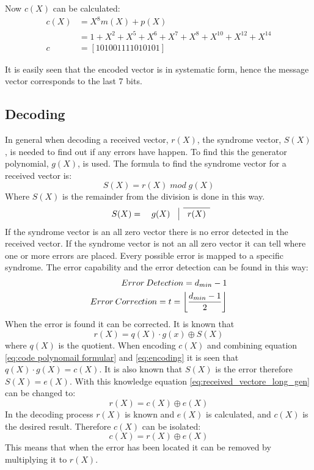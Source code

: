 \documentclass[Main]{subfiles}
\begin{document}
\noindent Now $c(X)$ can be calculated:
\begin{align}
c(X) &= X^8m(X)+p(X)\\ 
	&= 1 + X^2 + X^5 + X^6 + X^7 + X^8 + X^{10}+ X^{12} + X^{14} \\
c &= [1 0 1 0 0 1 1 1 1 0 1 0 1 0 1]
\end{align}

\noindent It is easily seen that the encoded vector is in systematic form, hence the message vector corresponds to the last 7 bits.

\subsection{Decoding}
In general when decoding a received vector, $ r(X) $, the syndrome vector, $ S(X) $, is needed to find out if any errors have happen.
To find this the generator polynomial, $ g(X) $, is used.
The formula to find the syndrome vector for a received vector is:
\begin{equation}
S(X) = r(X) \; mod \; g(X)
\label{syndrom formular}
\end{equation}
Where $ S(X) $ is the remainder from the division is done in this way. 
\[
\renewcommand\arraystretch{1.2}
\begin{array}{cccccccccccccccccc}
\cline{2-2}
 S(X) = \quad g(X) \quad \vline & r(X) \\
\end{array}
\]
If the syndrome vector is an all zero vector there is no error detected in the received vector.
If the syndrome vector is not an all zero vector it can tell where one or more errors are placed.
Every possible error is mapped to a specific syndrome.
The error capability and the error detection can be found in this way:
\begin{eqnarray}
Error \: Detection = d_{min}-1\\
Error \: Correction = t = \floor*{\frac{d_{min}-1}{2}}
\end{eqnarray}
When the error is found it can be corrected.
It is known that
\begin{equation}
\label{eq:received_vectore_long_gen}
r(X) = q(X) \cdot g(x) \oplus S(X)
\end{equation}
where $q(X)$ is the quotient.
When encoding $c(X)$ and combining equation \ref{eq:code polynomail formular} and \ref{eq:encoding} it is seen that $q(X) \cdot g(X) = c(X)$.
It is also known that $ S(X) $ is the error therefore $S(X) = e(X)$.
With this knowledge equation \ref{eq:received_vectore_long_gen} can be changed to:
\begin{equation}
r(X) = c(X) \oplus e(X)
\end{equation}
In the decoding process $ r(X) $ is known and $ e(X) $ is calculated, and $ c(X) $ is the desired result.
Therefore $ c(X) $ can be isolated:
\begin{equation}
c(X) = r(X) \oplus e(X)
\end{equation}
This means that when the error has been located it can be removed by multiplying it to $ r(X) $.
\end{document}
